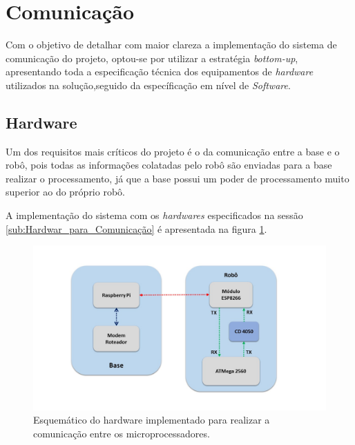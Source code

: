 \section{Comunicação} %
\label{sec:comunicação2}

	Com o objetivo de detalhar com maior clareza a implementação do sistema de comunicação do projeto, optou-se por utilizar a estratégia \textit{bottom-up}, apresentando toda a especificação técnica dos equipamentos de \textit{hardware} utilizados na solução,seguido da específicação em nível de \textit{Software}.

	\subsection{Hardware} %
	\label{sub:hardware}
		Um dos requisitos mais críticos do projeto é o da comunicação entre a base e o robô, pois todas as informações colatadas pelo robô são enviadas para a base realizar o processamento, já que a base possui um poder de processamento muito superior ao do próprio robô.

		A implementação do sistema com os \textit{hardwares} especificados na sessão \ref{sub:Hardwar_para_Comunicação} é apresentada na figura \ref{img:hardware_comunicação}.

		\begin{figure}[H]                                                           
      		\centering                    
      		\includegraphics[scale=0.5]{figuras/Hardware_Comunicacao.jpg}               
      		\caption{Esquemático do hardware implementado para realizar a comunicação entre os microprocessadores.}    
      		\label{img:hardware_comunicação}                                            
    	\end{figure}


